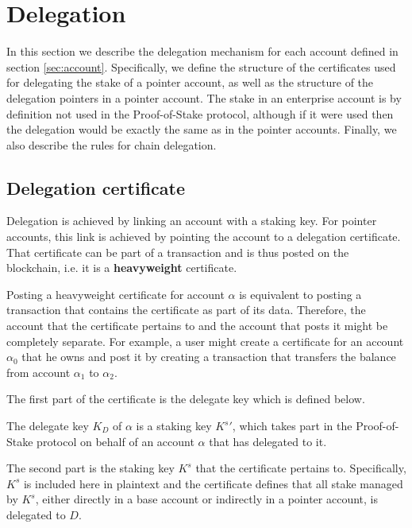 \section{Delegation}

In this section we describe the delegation mechanism for each account defined in section \ref{sec:account}. Specifically, we define the structure of the certificates used for delegating the stake of a pointer account, as well as the structure of the delegation pointers in a pointer account. The stake in an enterprise account is by definition not used in the Proof-of-Stake protocol, although if it were used then the delegation would be exactly the same as in the pointer accounts. Finally, we also describe the rules for chain delegation.

\subsection{Delegation certificate}

Delegation is achieved by linking an account with a staking key. For pointer accounts, this link is achieved by pointing the account to a delegation certificate. That certificate can be part of a transaction and is thus posted on the blockchain, i.e. it is a \textbf{heavyweight} certificate.

Posting a heavyweight certificate for account $\alpha$ is equivalent to posting a transaction that contains the certificate as part of its data. Therefore, the account that the certificate pertains to and the account that posts it might be completely separate. For example, a user might create a certificate for an account $\alpha_0$ that he owns and post it by creating a transaction that transfers the balance from account $\alpha_1$ to $\alpha_2$.

The first part of the certificate is the delegate key which is defined below.

\begin{defn}\label{def:delegate_key}
The delegate key $K_D$ of $\alpha$ is a staking key ${K^s}'$, which takes part in the Proof-of-Stake protocol on behalf of an account $\alpha$ that has delegated to it.
\end{defn}

The second part is the staking key $K^s$ that the certificate pertains to. Specifically, $K^s$ is included here in plaintext and the certificate defines that all stake managed by $K^s$, either directly in a base account or indirectly in a pointer account, is delegated to $D$.

